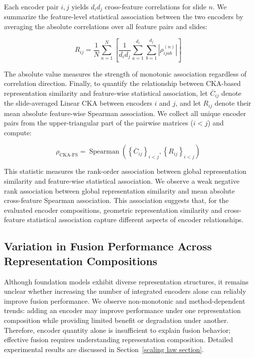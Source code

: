Each encoder pair \(i, j\) yields \(d_i d_j\) cross-feature correlations for slide \(n\).
We summarize the feature-level statistical association between the two encoders by averaging the absolute correlations over all feature pairs and slides:

\begin{equation}
    R_{ij}
    =
    \frac{1}{N}
    \sum_{n=1}^{N}
    \left[
    \frac{1}{d_i d_j}
    \sum_{a=1}^{d_i}
    \sum_{b=1}^{d_j}
    \left|\rho_{ijab}^{(n)}\right|
    \right]
\end{equation}

The absolute value measures the strength of monotonic association regardless of correlation direction.
Finally, to quantify the relationship between CKA-based representation similarity and feature-wise statistical association, let \(\overline{C}_{ij}\) denote the slide-averaged Linear CKA between encoders \(i\) and \(j\), and let \(R_{ij}\) denote their mean absolute feature-wise Spearman association.
We collect all unique encoder pairs from the upper-triangular part of the pairwise matrices (\(i<j\)) and compute:

\begin{equation}
    \rho_{\mathrm{CKA\text{-}FS}}
    =
    \operatorname{Spearman}
    \left(
    \left\{\overline{C}_{ij}\right\}_{i<j},
    \left\{R_{ij}\right\}_{i<j}
    \right)
\end{equation}

This statistic measures the rank-order association between global representation similarity and feature-wise statistical association.
We observe a weak negative rank association between global representation similarity and mean absolute cross-feature Spearman association.
This association suggests that, for the evaluated encoder compositions, geometric representation similarity and cross-feature statistical association capture different aspects of encoder relationships.

\subsection{Variation in Fusion Performance Across Representation Compositions}
Although foundation models exhibit diverse representation structures, it remains unclear whether increasing the number of integrated encoders alone can reliably improve fusion performance.
We observe non-monotonic and method-dependent trends: adding an encoder may improve performance under one representation composition while providing limited benefit or degradation under another.
Therefore, encoder quantity alone is insufficient to explain fusion behavior; effective fusion requires understanding representation composition.
Detailed experimental results are discussed in Section~\ref{scaling law section}.

